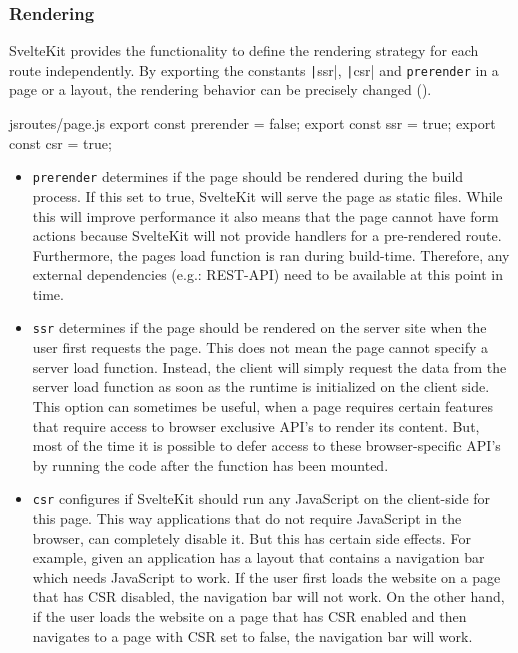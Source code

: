 \subsubsection{Rendering}

SvelteKit provides the functionality to define the rendering strategy for each route independently. By exporting the constants \texttt|ssr|, \texttt|csr| and \texttt{prerender} in a page or a layout, the rendering behavior can be precisely changed ().

\begin{listing}[h!]
\begin{myminted}{js}{routes/page.js}
export const prerender = false;
export const ssr = true;
export const csr = true;
\end{myminted}
\caption{Variables that can be exported to configure the rendering behavior of a page in SvelteKit.}
\label{fig:sveltekit-rendering-config}
\end{listing}

\begin{itemize}
    \item \texttt{prerender} determines if the page should be rendered during the build process. If this set to true, SvelteKit will serve the page as static files. While this will improve performance it also means that the page cannot have form actions because SvelteKit will not provide handlers for a pre-rendered route. Furthermore, the pages load function is ran during build-time. Therefore, any external dependencies (e.g.: REST-API) need to be available at this point in time.
    
    \item \texttt{ssr} determines if the page should be rendered on the server site when the user first requests the page. This does not mean the page cannot specify a server load function. Instead, the client will simply request the data from the server load function as soon as the runtime is initialized on the client side. This option can sometimes be useful, when a page requires certain features that require access to browser exclusive API's to render its content. But, most of the time it is possible to defer access to these browser-specific API's by running the code after the function has been mounted.

    \item \texttt{csr} configures if SvelteKit should run any JavaScript on the client-side for this page. This way applications that do not require JavaScript in the browser, can completely disable it. But this has certain side effects. For example, given an application has a layout that contains a navigation bar which needs JavaScript to work. If the user first loads the website on a page that has CSR disabled, the navigation bar will not work. On the other hand, if the user loads the website on a page that has CSR enabled and then navigates to a page with CSR set to false, the navigation bar will work.
\end{itemize}